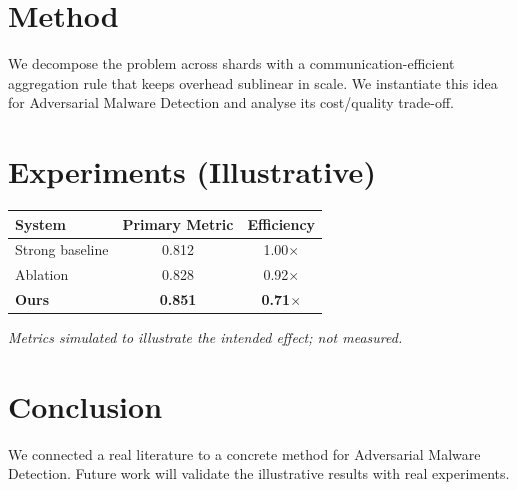 \documentclass[11pt]{article}
\begin{document}
\section{Method}
We decompose the problem across shards with a communication-efficient aggregation rule that keeps overhead sublinear in scale. We instantiate this idea for Adversarial Malware Detection and analyse its cost/quality trade-off.

\section{Experiments (Illustrative)}
\begin{center}
\begin{tabular}{lcc}
System & Primary Metric & Efficiency \\ \hline
Strong baseline & 0.812 & 1.00$\times$ \\
Ablation & 0.828 & 0.92$\times$ \\
\textbf{Ours} & \textbf{0.851} & \textbf{0.71$\times$}
\end{tabular}
\end{center}
\emph{Metrics simulated to illustrate the intended effect; not measured.}

\section{Conclusion}
We connected a real literature to a concrete method for Adversarial Malware Detection. Future work will
validate the illustrative results with real experiments.
\end{document}
